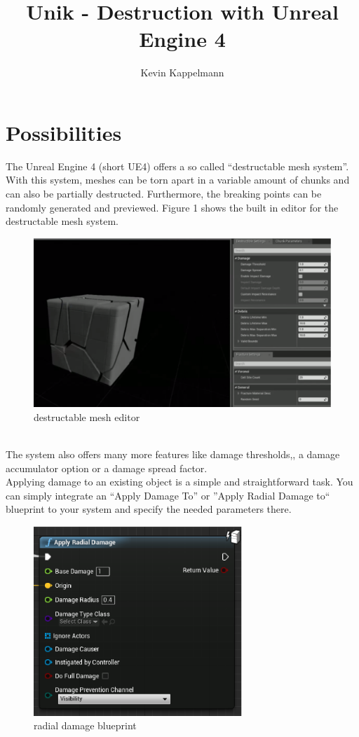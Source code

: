 \documentclass[12pt]{article}
\begin{document}
\title{Unik - Destruction with Unreal Engine 4}%
\author{Kevin Kappelmann}

\maketitle

\section{Possibilities}
The Unreal Engine 4 (short UE4) offers a so called ``destructable mesh system''. With this system, meshes can be torn apart in a variable amount of chunks and can also be partially destructed. Furthermore, the breaking points can be randomly generated and previewed. Figure 1 shows the built in editor for the destructable mesh system.\\
\begin{figure}[ht]
	\centering
  \includegraphics[width=1\textwidth]{destrEditor.eps}
	\caption{destructable mesh editor}
\end{figure}
\\
The system also offers many more features like damage thresholds,, a damage accumulator option or a damage spread factor.\\
Applying damage to an existing object is a simple and straightforward task. You can simply integrate an ``Apply Damage To'' or ''Apply Radial Damage to`` blueprint to your system and specify the needed parameters there.\\
\begin{figure}[ht]
	\centering
  \includegraphics[width=0.7\textwidth]{radialDamage.eps}
	\caption{radial damage blueprint}
\end{figure}
\end{document}
